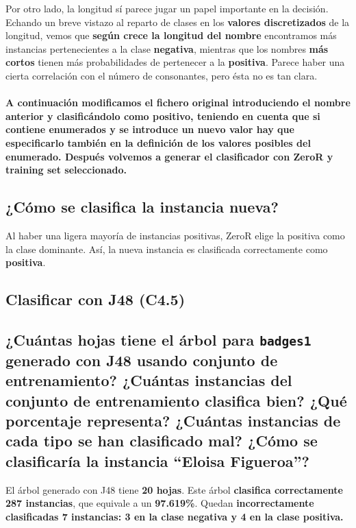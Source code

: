 \documentclass[12pt]{article}
\begin{document}
Por otro lado, la longitud sí parece jugar un papel importante en la decisión. Echando un breve vistazo al reparto de clases en los \textbf{valores discretizados} de la longitud, vemos que \textbf{según crece la longitud del nombre} encontramos más instancias pertenecientes a la clase \textbf{negativa}, mientras que los nombres \textbf{más cortos} tienen más probabilidades de pertenecer a la \textbf{positiva}. Parece haber una cierta correlación con el número de consonantes, pero ésta no es tan clara.

\paragraph{\small A continuación modificamos el fichero original introduciendo el nombre anterior y clasificándolo como positivo, teniendo en cuenta que si contiene enumerados y se introduce un nuevo valor hay que especificarlo también en la definición de los valores posibles del enumerado. Después volvemos a generar el clasificador con ZeroR y training set seleccionado.}

\subsection*{\small ¿Cómo se clasifica la instancia nueva?}

Al haber una ligera mayoría de instancias positivas, ZeroR elige la positiva como la clase dominante. Así, la nueva instancia es clasificada correctamente como \textbf{positiva}.

\newpage

\begin{center}
\section{Clasificar con J48 (C4.5)}
\end{center}

\subsection*{\small ¿Cuántas hojas tiene el árbol para \texttt{badges1} generado con J48 usando conjunto de entrenamiento? ¿Cuántas instancias del conjunto de entrenamiento clasifica bien? ¿Qué porcentaje representa? ¿Cuántas instancias de cada tipo se han clasificado mal? ¿Cómo se clasificaría la instancia ``Eloisa Figueroa''?}

El árbol generado con J48 tiene \textbf{20 hojas}. Este árbol \textbf{clasifica correctamente 287 instancias}, que equivale a un \textbf{97.619\%}. Quedan \textbf{incorrectamente clasificadas 7 instancias: 3 en la clase negativa y 4 en la clase positiva.}
\end{document}
